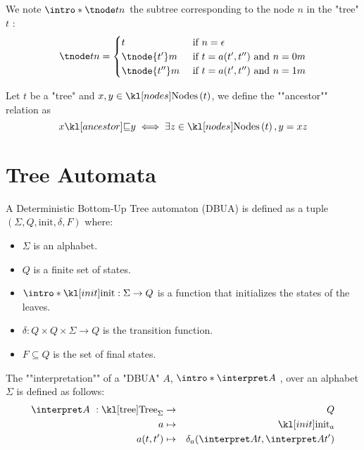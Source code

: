 \documentclass{article}
\begin{document}
\begin{definition}
	We note $\intro* \tnode t n$ the subtree corresponding to the node $n$ in the "tree" $t$ :
	\[
		\tnode t n =   \begin{cases}
			t              & \text{ if }  n = \epsilon                     \\
			\tnode {t'} m  & \text{ if } t = a(t',t'') \text{ and } n = 0m \\
			\tnode {t''} m & \text{ if } t = a(t',t'') \text{ and } n = 1m
		\end{cases}
	\]
\end{definition}

\begin{definition}
	Let $t$ be a "tree" and $x, y \in \nodes t$, we define the ""ancestor"" relation as
	\[ \ancestor x y \iff \exists z \in \nodes t, y = xz \]
\end{definition}

\section{Tree Automata}

\begin{definition}
	A Deterministic Bottom-Up Tree automaton (DBUA) is defined as a tuple $(\Sigma, Q, \text{init}, \delta, F)$ where:
	\begin{itemize}
		\item $\Sigma$ is an alphabet.
		\item $Q$ is a finite set of states.
		\item $\intro *\init : \Sigma \to Q$ is a function that initializes the states of the leaves.
		\item $\delta : Q \times Q \times \Sigma \to Q$ is the transition function.
		\item $F \subseteq Q$ is the set of final states.
	\end{itemize}
\end{definition}

\begin{definition}
	The ""interpretation"" of a "DBUA" $A$,  $\intro* \interpret A ~$, over an alphabet $\Sigma$ is defined as follows:
	\begin{eqnarray*}
		\interpret A ~: \tree_{\Sigma} &\to& Q \\
		a &\mapsto& \init_a \\
		a(t,t') &\mapsto& \delta_a (\interpret A t, \interpret A {t'})
	\end{eqnarray*}
\end{definition}
\end{document}
